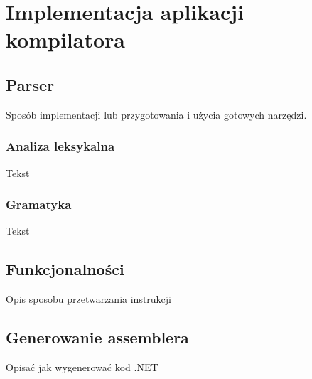 \chapter{Implementacja aplikacji kompilatora}
\label{rozdzial3}

\section{Parser}
Sposób implementacji lub przygotowania i użycia gotowych narzędzi.

\subsection{Analiza leksykalna}
Tekst
\subsection{Gramatyka}
Tekst
\section{Funkcjonalności}
Opis sposobu przetwarzania instrukcji
\section{Generowanie assemblera}
Opisać jak wygenerować kod .NET

